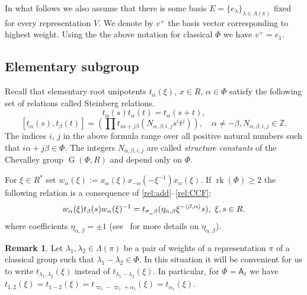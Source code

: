 \documentclass[12pt]{amsart}
\numberwithin{equation}{section}
\theoremstyle{definition}
\newtheorem{rem}[equation]{Remark}
\DeclareMathOperator{\G}{G}
\DeclareMathOperator{\rk}{rk}
\newcommand{\rA}{\mathsf{A}}
\def\ssub#1{\mathchoice
   {_{\lower2pt\hbox{$\scriptstyle #1$}}}
   {_{\lower2pt\hbox{$\scriptstyle #1$}}}
   {_{\lower1.5pt\hbox{$\scriptscriptstyle #1$}}}
   {_{\!\lower1.5pt\hbox{$\scriptscriptstyle #1$}}}}
\begin{document}
In what follows we also assume that there is some basis $E=\{e_\lambda\}_{\lambda\in\Lambda(\pi)}$ fixed for every representation $V$.
We denote by $v^+$ the basis vector corresponding to highest weight. 
Using the the above notation for classical $\Phi$ we have $v^+=e_1$.

\subsection{Elementary subgroup}
Recall that elementary root unipotents $t_{\alpha}(\xi)$, $x\in R$, $\alpha\in\Phi$ satisfy the following set of relations called Steinberg relations.
\begin{equation}\label{rel:add} t_\alpha(s) t_\alpha(t) = t_\alpha(s+t), \end{equation} 
\begin{equation}\label{rel:CCF} [t_\alpha(s),  t_\beta(t)] = \left(\prod\limits t_{i\alpha + j\beta}(N_{\alpha,\beta, i, j}s^i t^j)\right),\quad \alpha\neq-\beta, N_{\alpha, \beta, i, j}\in\mathbb{Z}.\end{equation}
The indices $i$, $j$ in the above formula range over all positive natural numbers such that $i\alpha + j\beta\in\Phi$.
The integers $N_{\alpha, \beta, i, j}$ are called {\it structure constants} of the Chevalley group $\G(\Phi,R)$ and depend only on $\Phi$.

For $\xi\in R^*$ set $w_\alpha(\xi) := x_\alpha(\xi) x_{-\alpha}(-\xi^{-1}) x_{\alpha}(\xi).$
If $\rk(\Phi)\geq 2$ the following relation is a consequence of \ref{rel:add}--\ref{rel:CCF}:
\begin{equation}\label{rel:R3} w_\alpha(\xi) t_{\beta}(s) w_\alpha(\xi)^{-1} =
t_{\sigma\ssub{\alpha}\beta} (\eta_{\alpha, \beta}\xi^{-\langle\beta,\alpha \rangle} s),\ \xi,s\in R. \end{equation}
where coefficients $\eta_{\alpha, \beta} = \pm 1$ (see~\cite[\S~13]{VP} for more details on $\eta_{\alpha, \beta}$).

\begin{rem} Let $\lambda_1, \lambda_2 \in \Lambda(\pi)$ be a pair of weights of a representation $\pi$ of a classical group such that $\lambda_1-\lambda_2\in \Phi$.
In this situation it will be convenient for us to write $t_{\lambda_1,\lambda_2}(\xi)$ instead of $t_{\lambda_1-\lambda_2}(\xi)$.
In particular, for $\Phi=\rA_\ell$ we have $t_{1,2}(\xi)=t_{1-2}(\xi)=t_{\varpi_1 - \varpi_1 + \alpha_1}(\xi) = t_{\alpha_1}(\xi)$. \end{rem}
\end{document}
